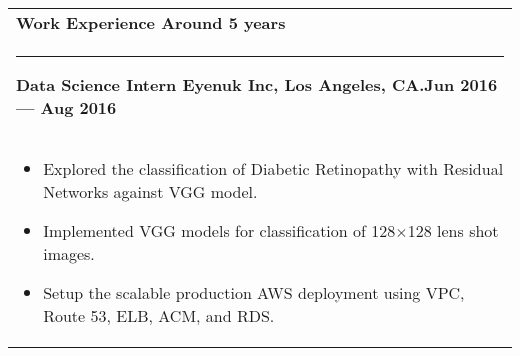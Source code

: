 \documentclass{article}
\begin{document}
\begin{tabular}{p{\dimexpr\linewidth-2\tabcolsep}}
    \bfseries \large{Work Experience} \hfill Around 5 years \\
    \noindent\rule{\textwidth}{0.4pt}
    \smallskip
    {\bfseries Data Science Intern \hfill Eyenuk Inc, Los Angeles, CA\@.\hfill Jun 2016 --- Aug 2016} \\
    \begin{itemize}
        \item Explored the classification of Diabetic Retinopathy with Residual Networks against VGG model.
        \item Implemented VGG models for classification of 128$\times$128 lens shot images.
        \item Setup the scalable production AWS deployment using VPC, Route 53, ELB, ACM, and RDS\@.
    \end{itemize}


\end{tabular}
\end{document}
